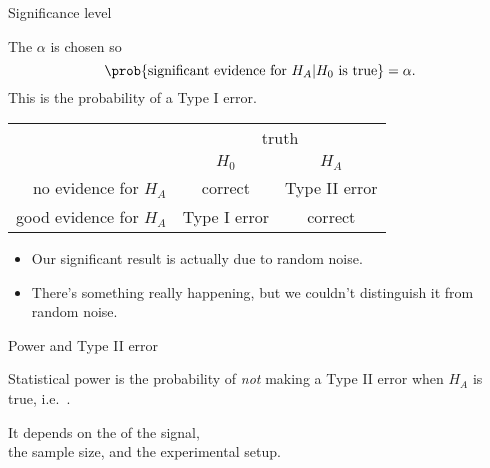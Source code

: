 \begin{frame}{Significance level}

    The  $\alpha$ is chosen so
    \[
        \prob \{ \text{significant evidence for $H_A$} | \text{$H_0$ is true} \} = \alpha .
    \]
    This is the probability of a \alert{Type I error}.


    \vspace{2em}

    \begin{tabular}{r|cc}
        & \multicolumn{2}{c}{truth} \\
        & $H_0$ & $H_A$ \\
        \hline
        no evidence for $H_A$ & correct & Type II error \\
        good evidence for $H_A$ & Type I error & correct \\
    \end{tabular}

    \vspace{2em}

    \begin{itemize}
        \item[Type I:] Our significant result is actually due to random noise.
        \item[Type II:] There's something really happening, but we couldn't distinguish it from random noise.
    \end{itemize}

\end{frame}


\begin{frame}{Power and Type II error}

    \begin{block}{}
        \alert{Statistical power} is the probability of \emph{not} making a Type II error when $H_A$ is true,
        i.e.\ .
    \end{block}
    

    \vspace{2em}

    It depends on the  of the signal,\\
    the sample size, and the experimental setup.

\end{frame}


